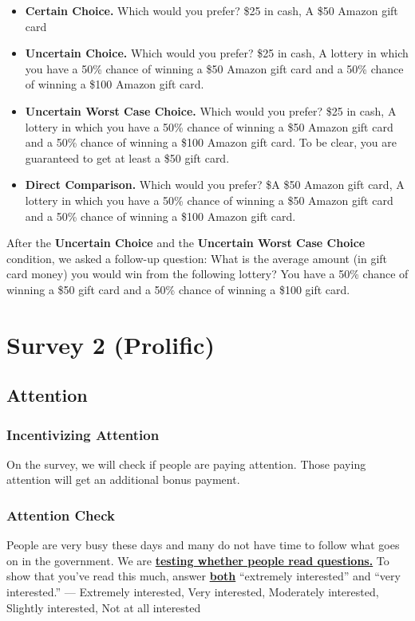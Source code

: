 \documentclass[12pt, letterpaper]{article}
\begin{document}
\begin{itemize}
    \item \textbf{Certain Choice.} Which would you prefer? \$25 in cash, A \$50 Amazon gift card
    
    \item \textbf{Uncertain Choice.} Which would you prefer? \$25 in cash, A lottery in which you have a 50\% chance of winning a \$50 Amazon gift card and a 50\% chance of winning a \$100 Amazon gift card.
    
    \item \textbf{Uncertain Worst Case Choice.} Which would you prefer? \$25 in cash, A lottery in which you have a 50\% chance of winning a \$50 Amazon gift card and a 50\% chance of winning a \$100 Amazon gift card. To be clear, you are guaranteed to get at least a \$50 gift card.

    \item \textbf{Direct Comparison.} Which would you prefer? \$A \$50 Amazon gift card, A lottery in which you have a 50\% chance of winning a \$50 Amazon gift card and a 50\% chance of winning a \$100 Amazon gift card.
    
\end{itemize}

After the \textbf{Uncertain Choice} and the \textbf{Uncertain Worst Case Choice} condition, we asked a follow-up question:  What is the average amount (in gift card money) you would win from the following lottery? You have a 50\% chance of winning a \$50 gift card and a 50\% chance of winning a \$100 gift card.

\section{Survey 2 (Prolific)}

\subsection{Attention}

\subsubsection{Incentivizing Attention}
On the survey, we will check if people are paying attention. Those paying attention will get an additional bonus payment.

\subsubsection{Attention Check}
People are very busy these days and many do not have time to follow what goes on in the government. We are \textbf{\underline{testing whether people read questions.}} To show that you've read this much, answer \textbf{\underline{both}} ``extremely interested'' and ``very interested.'' --- Extremely interested, Very interested,  Moderately interested, Slightly interested, Not at all interested
\end{document}
